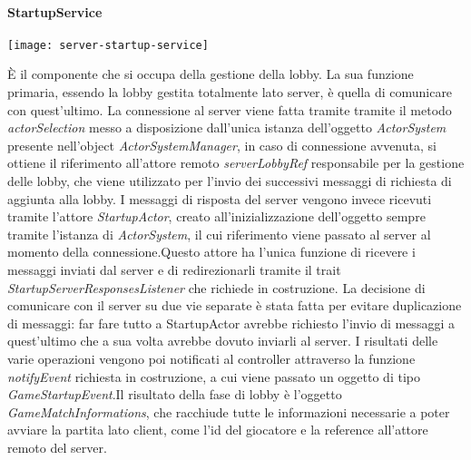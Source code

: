 \paragraph{StartupService}
\begin{center}
    \texttt{[image: server-startup-service]}
\end{center}
È il componente che si occupa della gestione della lobby.
La sua funzione primaria, essendo la lobby gestita totalmente lato server, è quella di comunicare con quest’ultimo. \newline La connessione al server viene fatta tramite tramite il metodo \textit{actorSelection} messo a disposizione dall’unica istanza dell’oggetto \textit{ActorSystem} presente nell’object \textit{ActorSystemManager}, in caso di connessione avvenuta, si ottiene il riferimento all’attore remoto \textit{serverLobbyRef} responsabile per la gestione delle lobby, che viene utilizzato per l’invio dei successivi messaggi di richiesta di aggiunta alla lobby. \newline
I messaggi di risposta del server vengono invece ricevuti tramite l’attore \textit{StartupActor}, creato all’inizializzazione dell’oggetto sempre tramite l’istanza di \textit{ActorSystem}, il cui riferimento viene passato al server al momento della connessione.\newline Questo attore ha l’unica funzione di ricevere i messaggi inviati dal server e di redirezionarli tramite il trait \textit{StartupServerResponsesListener} che richiede in costruzione.\newline
La decisione di comunicare con il server su due vie separate è stata fatta per evitare duplicazione di messaggi: far fare tutto a StartupActor avrebbe richiesto l’invio di messaggi a quest’ultimo che a sua volta avrebbe dovuto inviarli al server.
I risultati delle varie operazioni vengono poi notificati al controller attraverso la funzione \textit{notifyEvent} richiesta in costruzione, a cui viene passato un oggetto di tipo \textit{GameStartupEvent}.\newline Il risultato della fase di lobby è l’oggetto \textit{GameMatchInformations}, che racchiude tutte le informazioni necessarie a poter avviare la partita lato client, come l'id del giocatore e la reference all'attore remoto del server.
